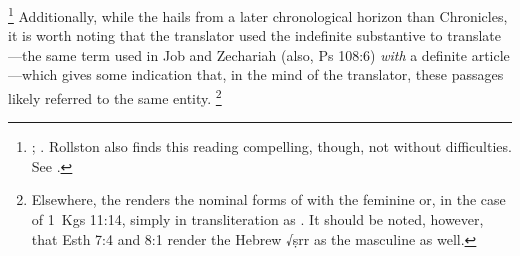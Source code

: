     \footnote{%
        \cite[216--217]{braun1986};
        \cite[107]{coggins1976}. Rollston also finds this reading compelling, though, not without difficulties. See 
        \cite[4--5]{rollston_keith-stuckenbruck2016}.}
Additionally, while the \lxx hails from a later chronological horizon than Chronicles, it is worth noting that the translator used the indefinite substantive  to translate ---the same term used in Job and Zechariah (also, Ps 108:6) \emph{with} a definite article---which gives some indication that, in the mind of the translator, these passages likely referred to the same entity.%
    \footnote{Elsewhere, the \lxx renders the nominal forms of  with the feminine  or, in the case of 1~Kgs 11:14, simply in transliteration as . It should be noted, however, that Esth 7:4 and 8:1 render the Hebrew √ṣrr as the masculine  as well.} 

